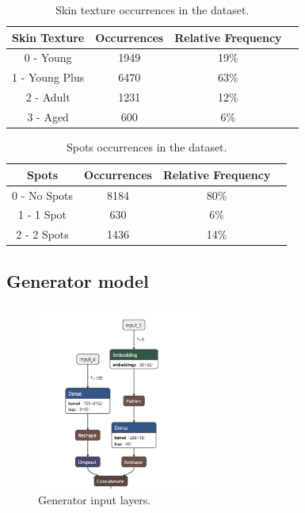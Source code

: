 \documentclass[12pt,a4paper,oneside]{memoir}
\begin{document}
    
        
      \begin{table}
    \begin{center}
    \begin{tabular}{ |c|c|c|c| } 
    \hline
    Skin Texture & Occurrences & Relative Frequency\\
    \hline
        0 - Young &  1949 & 19\% \\ 
        1 - Young Plus & 6470 & 63\% \\ 
        2 - Adult & 1231 & 12\% \\ 
        3 - Aged & 600 & 6\% \\ 


    \hline
    \end{tabular}
    \caption{Skin texture occurrences in the dataset.}
    \label{tab:skin_text}
    \end{center}
    \end{table}
    
    
           
      \begin{table}
    \begin{center}
    \begin{tabular}{ |c|c|c|c| } 
    \hline
    Spots & Occurrences & Relative Frequency\\
    \hline
        0 - No Spots &  8184 & 80\% \\ 
        1 - 1 Spot & 630& 6\% \\ 
        2 - 2 Spots & 1436 & 14\% \\ 


    \hline
    \end{tabular}
    \caption{Spots occurrences in the dataset.}
    \label{tab:spots}
    \end{center}
    \end{table}
    
    
    
    \subsection{Generator model}
    \label{sec:cgangen}
    
    \begin{figure}[H]
    \centering
    \includegraphics[width=0.5\textwidth]{images/generator_1.png}
    \caption{Generator input layers.}
    \centering
    \label{fig:neuron}
    \end{figure}
    
\end{document}
